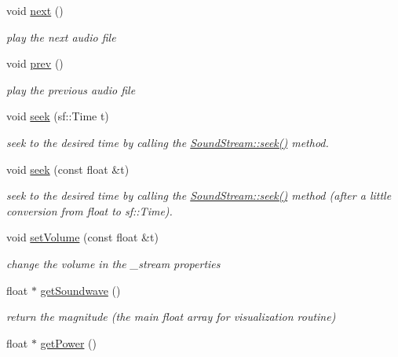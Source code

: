\begin{DoxyCompactItemize}
void \hyperlink{classAudioManager_a85dcceef2457dbe3bab535a196939ee3}{next} ()
\begin{DoxyCompactList}\small\item\em play the next audio file \end{DoxyCompactList}\item 
void \hyperlink{classAudioManager_a52f9fea4eb26acfa96272953483e88d9}{prev} ()
\begin{DoxyCompactList}\small\item\em play the previous audio file \end{DoxyCompactList}\item 
void \hyperlink{classAudioManager_a92ce12738c28d9fbe99539976a1959bc}{seek} (sf\+::\+Time t)
\begin{DoxyCompactList}\small\item\em seek to the desired time by calling the \hyperlink{classSoundStream_ad6d518aee983bc841767e884645bac8a}{Sound\+Stream\+::seek()} method. \end{DoxyCompactList}\item 
void \hyperlink{classAudioManager_a63bca3852ff5b316fa72e56c3f999e8e}{seek} (const float \&t)
\begin{DoxyCompactList}\small\item\em seek to the desired time by calling the \hyperlink{classSoundStream_ad6d518aee983bc841767e884645bac8a}{Sound\+Stream\+::seek()} method (after a little conversion from float to sf\+::\+Time). \end{DoxyCompactList}\item 
void \hyperlink{classAudioManager_a716945a9f65dc8b4cb83d1b034ac16dc}{set\+Volume} (const float \&t)
\begin{DoxyCompactList}\small\item\em change the volume in the \+\_\+stream properties \end{DoxyCompactList}\item 
float $\ast$ \hyperlink{classAudioManager_a97d86d8a7a19aaf875b1e1e7febe8eff}{get\+Soundwave} ()\hypertarget{classAudioManager_a97d86d8a7a19aaf875b1e1e7febe8eff}{}\label{classAudioManager_a97d86d8a7a19aaf875b1e1e7febe8eff}

\begin{DoxyCompactList}\small\item\em return the magnitude (the main float array for visualization routine) \end{DoxyCompactList}\item 
float $\ast$ \hyperlink{classAudioManager_a32bbbfd86fba23792377d08b0ef80c19}{get\+Power} ()\hypertarget{classAudioManager_a32bbbfd86fba23792377d08b0ef80c19}{}\label{classAudioManager_a32bbbfd86fba23792377d08b0ef80c19}


\end{DoxyCompactItemize}
